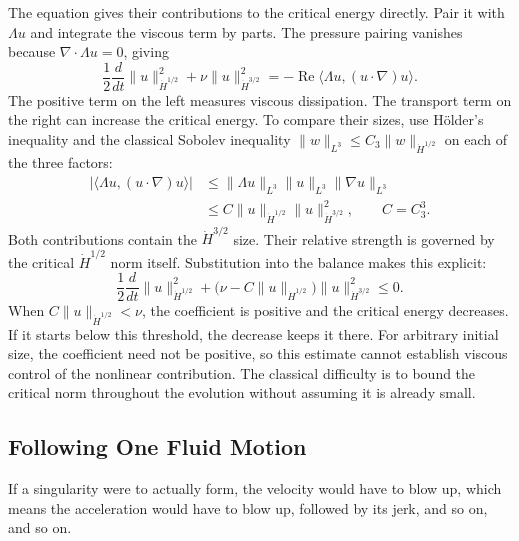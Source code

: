 The equation gives their contributions to the critical energy directly.
Pair it with \(\Lambda u\)
and integrate the viscous term by parts. The pressure pairing vanishes
because \(\nabla\cdot\Lambda u=0\), giving
\[
 \frac12\frac{d}{dt}\|u\|_{\dot H^{1/2}}^2
 +\nu\|u\|_{\dot H^{3/2}}^2
 =-\operatorname{Re}\langle\Lambda u,(u\cdot\nabla)u\rangle.
\]
The positive term on the left measures viscous dissipation. The transport
term on the right can increase the critical energy. To compare their sizes,
use H\"older's inequality and the classical Sobolev inequality
\(\|w\|_{L^3}\le C_3\|w\|_{\dot H^{1/2}}\) on each of the three factors:
\[
 \begin{aligned}
 |\langle\Lambda u,(u\cdot\nabla)u\rangle|
 &\le\|\Lambda u\|_{L^3}\|u\|_{L^3}\|\nabla u\|_{L^3}\\
 &\le C\|u\|_{\dot H^{1/2}}\|u\|_{\dot H^{3/2}}^2,
 \qquad C=C_3^3.
 \end{aligned}
\]
Both contributions contain the \(\dot H^{3/2}\) size. Their relative
strength is governed by the critical \(\dot H^{1/2}\) norm itself.
Substitution into the balance makes this explicit:
\[
 \frac12\frac{d}{dt}\|u\|_{\dot H^{1/2}}^2
 +\bigl(\nu-C\|u\|_{\dot H^{1/2}}\bigr)
       \|u\|_{\dot H^{3/2}}^2\le0.
\]
When \(C\|u\|_{\dot H^{1/2}}<\nu\), the coefficient is positive and
the critical energy decreases. If it starts below this threshold, the
decrease keeps it there. For arbitrary initial size, the coefficient need
not be positive, so this estimate cannot establish viscous control of the
nonlinear contribution. The classical difficulty is to bound the critical
norm throughout the evolution without assuming it is already small.

\subsection*{Following One Fluid Motion}

If a singularity were to actually form, the velocity would have to blow up,
which means the acceleration would have to blow up, followed by its jerk,
and so on, and so on.



